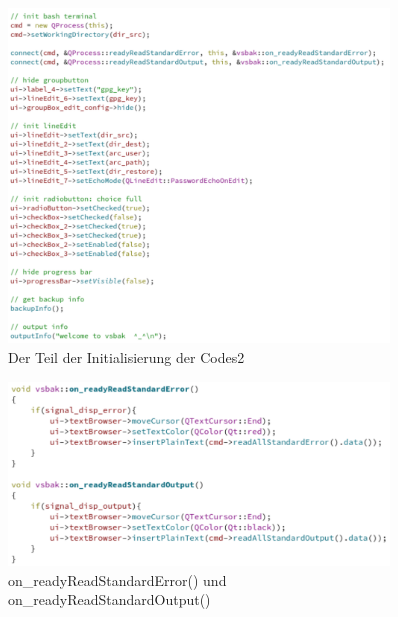 \begin{figure}[h!]
	\centering
	\includegraphics[width=0.9\textwidth]{bilder/code_init_2.png}
	\caption{Der Teil der Initialisierung der Codes2 }
	\label{Abbildung_19}
\end{figure}

\begin{figure}[h!]
	\centering
	\includegraphics[width=0.9\textwidth]{bilder/code_err_out.png}
	\caption{ on\_readyReadStandardError() und  on\_readyReadStandardOutput() }
	\label{Abbildung_20}
\end{figure}

